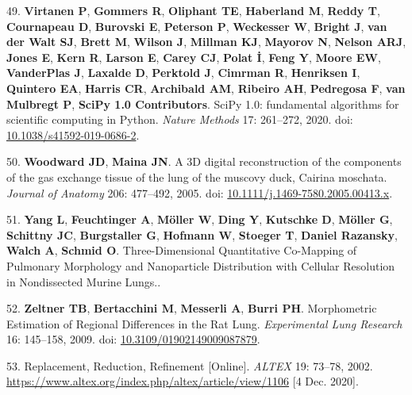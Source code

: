\documentclass[
  american,
]{article}
\newenvironment{cslreferences}%
  {}%
  {\par}
\begin{document}
\begin{cslreferences}
\leavevmode\hypertarget{ref-8Miti2Gz}{}%
49. \textbf{Virtanen P}, \textbf{Gommers R}, \textbf{Oliphant TE}, \textbf{Haberland M}, \textbf{Reddy T}, \textbf{Cournapeau D}, \textbf{Burovski E}, \textbf{Peterson P}, \textbf{Weckesser W}, \textbf{Bright J}, \textbf{van der Walt SJ}, \textbf{Brett M}, \textbf{Wilson J}, \textbf{Millman KJ}, \textbf{Mayorov N}, \textbf{Nelson ARJ}, \textbf{Jones E}, \textbf{Kern R}, \textbf{Larson E}, \textbf{Carey CJ}, \textbf{Polat İ}, \textbf{Feng Y}, \textbf{Moore EW}, \textbf{VanderPlas J}, \textbf{Laxalde D}, \textbf{Perktold J}, \textbf{Cimrman R}, \textbf{Henriksen I}, \textbf{Quintero EA}, \textbf{Harris CR}, \textbf{Archibald AM}, \textbf{Ribeiro AH}, \textbf{Pedregosa F}, \textbf{van Mulbregt P}, \textbf{SciPy 1.0 Contributors}. SciPy 1.0: fundamental algorithms for scientific computing in Python. \emph{Nature Methods} 17: 261--272, 2020. doi: \href{https://doi.org/10.1038/s41592-019-0686-2}{10.1038/s41592-019-0686-2}.

\leavevmode\hypertarget{ref-CPhMy3Ie}{}%
50. \textbf{Woodward JD}, \textbf{Maina JN}. A 3D digital reconstruction of the components of the gas exchange tissue of the lung of the muscovy duck, Cairina moschata. \emph{Journal of Anatomy} 206: 477--492, 2005. doi: \href{https://doi.org/10.1111/j.1469-7580.2005.00413.x}{10.1111/j.1469-7580.2005.00413.x}.

\leavevmode\hypertarget{ref-19jBv0ima}{}%
51. \textbf{Yang L}, \textbf{Feuchtinger A}, \textbf{Möller W}, \textbf{Ding Y}, \textbf{Kutschke D}, \textbf{Möller G}, \textbf{Schittny JC}, \textbf{Burgstaller G}, \textbf{Hofmann W}, \textbf{Stoeger T}, \textbf{Daniel Razansky}, \textbf{Walch A}, \textbf{Schmid O}. Three-Dimensional Quantitative Co-Mapping of Pulmonary Morphology and Nanoparticle Distribution with Cellular Resolution in Nondissected Murine Lungs..

\leavevmode\hypertarget{ref-I9TmP6IU}{}%
52. \textbf{Zeltner TB}, \textbf{Bertacchini M}, \textbf{Messerli A}, \textbf{Burri PH}. Morphometric Estimation of Regional Differences in the Rat Lung. \emph{Experimental Lung Research} 16: 145--158, 2009. doi: \href{https://doi.org/10.3109/01902149009087879}{10.3109/01902149009087879}.

\leavevmode\hypertarget{ref-199ALtdJt}{}%
53. Replacement, Reduction, Refinement {[}Online{]}. \emph{ALTEX} 19: 73--78, 2002. \url{https://www.altex.org/index.php/altex/article/view/1106} {[}4 Dec. 2020{]}.
\end{cslreferences}
\end{document}
